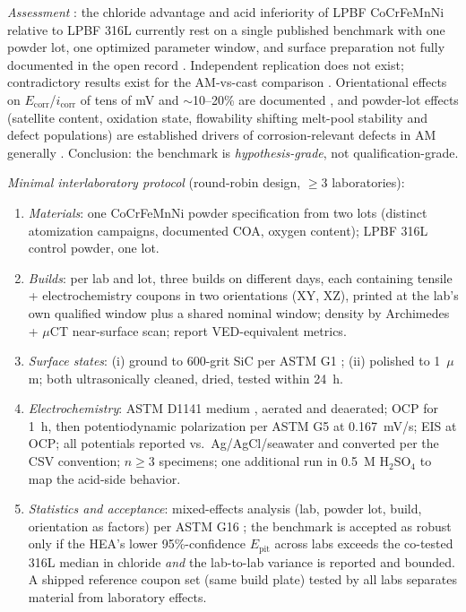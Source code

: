 \emph{Assessment} \evid{}: the chloride advantage and acid inferiority of LPBF CoCrFeMnNi relative to LPBF 316L currently rest on a single published benchmark with one powder lot, one optimized parameter window, and surface preparation not fully documented in the open record \cite{lpbf_cantor_2024}. Independent replication does not exist; contradictory results exist for the AM-vs-cast comparison \cite{frontiers2020slmcast}. Orientational effects on $E_{\mathrm{corr}}$/$i_{\mathrm{corr}}$ of tens of mV and $\sim$10--20\% are documented \cite{frontiers2020slmcast,slm_params2024}, and powder-lot effects (satellite content, oxidation state, flowability shifting melt-pool stability and defect populations) are established drivers of corrosion-relevant defects in AM generally \cite{npd_am_review2026}. Conclusion: the benchmark is \emph{hypothesis-grade}, not qualification-grade.

\emph{Minimal interlaboratory protocol} \prop{} (round-robin design, $\geq$3 laboratories):
\begin{enumerate}
\item \emph{Materials}: one CoCrFeMnNi powder specification from two lots (distinct atomization campaigns, documented COA, oxygen content); LPBF 316L control powder, one lot.
\item \emph{Builds}: per lab and lot, three builds on different days, each containing tensile + electrochemistry coupons in two orientations (XY, XZ), printed at the lab's own qualified window plus a shared nominal window; density by Archimedes + $\mu$CT near-surface scan; report VED-equivalent metrics.
\item \emph{Surface states}: (i) ground to 600-grit SiC per ASTM G1 \cite{astm_g1}; (ii) polished to 1~$\mu$m; both ultrasonically cleaned, dried, tested within 24~h.
\item \emph{Electrochemistry}: ASTM D1141 medium \cite{astm_d1141}, aerated and deaerated; OCP for 1~h, then potentiodynamic polarization per ASTM G5 \cite{astm_g5} at 0.167~mV/s; EIS at OCP; all potentials reported vs.\ Ag/AgCl/seawater and converted per the CSV convention; $n\geq3$ specimens; one additional run in 0.5~M H$_2$SO$_4$ to map the acid-side behavior.
\item \emph{Statistics and acceptance}: mixed-effects analysis (lab, powder lot, build, orientation as factors) per ASTM G16 \cite{astm_g16}; the benchmark is accepted as robust only if the HEA's lower 95\%-confidence $E_{\mathrm{pit}}$ across labs exceeds the co-tested 316L median in chloride \emph{and} the lab-to-lab variance is reported and bounded. A shipped reference coupon set (same build plate) tested by all labs separates material from laboratory effects.
\end{enumerate}

